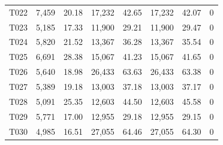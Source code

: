 \begin{table}[!p]
\begin{tabular}{lrrrrrrr}
T022 & 7,459 & 20.18 & 17,232 & 42.65 & 17,232 & 42.07 & 0 \\
T023 & 5,185 & 17.33 & 11,900 & 29.21 & 11,900 & 29.47 & 0 \\
T024 & 5,820 & 21.52 & 13,367 & 36.28 & 13,367 & 35.54 & 0 \\
T025 & 6,691 & 28.38 & 15,067 & 41.23 & 15,067 & 41.65 & 0 \\
T026 & 5,640 & 18.98 & 26,433 & 63.63 & 26,433 & 63.38 & 0 \\
T027 & 5,389 & 19.18 & 13,003 & 37.18 & 13,003 & 37.17 & 0 \\
T028 & 5,091 & 25.35 & 12,603 & 44.50 & 12,603 & 45.58 & 0 \\
T029 & 5,771 & 17.00 & 12,955 & 29.18 & 12,955 & 29.15 & 0 \\
T030 & 4,985 & 16.51 & 27,055 & 64.46 & 27,055 & 64.30 & 0 \\
\bottomrule
\end{tabular}
\end{table}
